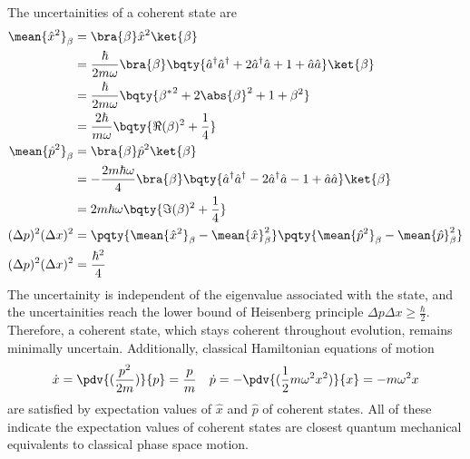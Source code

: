 \documentclass[12pt]{article}
\begin{document}
        The uncertainities of a coherent state are \begin{align*}
            \mean{\hat{x}^2}_{\beta} &=  \bra{\beta} \hat{x}^2 \ket{\beta} \\
            &= {\frac{\hbar}{2m\omega}}\bra{\beta} \bqty{\hat{a}^\dagger \hat{a}^\dagger  + 2\hat{a}^\dagger \hat{a} + 1+ \hat{a}\hat{a}} \ket{\beta} \\
            &= {\frac{\hbar}{2m\omega}} \bqty{{\beta^*}^2  + 2\abs{\beta}^2 + 1+ \beta^2}  \\
            &= {\frac{2\hbar}{m\omega}} \bqty{\Re(\beta)^2 + \frac{1}{4}}  \\
            \mean{\hat{p}^2}_\beta &= \bra{\beta} \hat{p}^2 \ket{\beta} \\
            &= -\frac{2m\hbar\omega }{4} \bra{\beta}\bqty{\hat{a}^\dagger \hat{a}^\dagger  - 2\hat{a}^\dagger \hat{a} - 1 + \hat{a}\hat{a}} \ket{\beta} \\
            &= {2m\hbar\omega }\bqty{\Im(\beta)^2 + \frac{1}{4}}\\
            (\Delta p)^2 (\Delta x)^2 &= \pqty{\mean{\hat{x}^2}_\beta - \mean{\hat{x}}_\beta^2}\pqty{\mean{\hat{p}^2}_\beta - \mean{\hat{p}}_\beta^2}\\
            (\Delta p)^2 (\Delta x)^2 &= \frac{\hbar^2}{4}
        \end{align*}
        The uncertainity is independent of the eigenvalue associated with the state, and the uncertainities reach the lower bound of Heisenberg principle \(\Delta p \Delta x \geq \frac{\hbar}{2}\). Therefore, a coherent state, which stays coherent throughout evolution, remains minimally uncertain. Additionally, classical Hamiltonian equations of motion \begin{align*}
            \dot{x} &= \pdv{(\frac{p^2}{2m})}{p}= \frac{p}{m}& \dot{p} = - \pdv{(\frac{1}{2}m \omega^2 x^2)}{x} = -m\omega^2 x
        \end{align*} are satisfied by expectation values of \(\hat{x}\) and \(\hat{p}\) of coherent states. All of these indicate the expectation values of coherent states are closest quantum mechanical equivalents to classical phase space motion.
\end{document}
